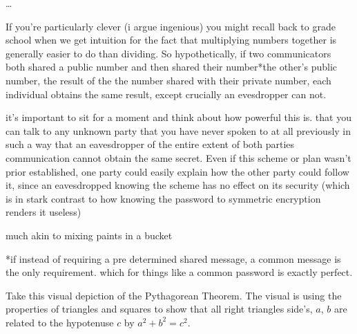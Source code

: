 \documentclass[11pt,a4paper]{article}
\begin{document}
…

If you’re particularly clever (i argue ingenious) you might recall back to grade school when we get intuition for the fact that multiplying numbers together is generally easier to do than dividing. So hypothetically, if two communicators both shared a public number and then shared their number*the other’s public number, the result of the the number shared with their private number, each individual obtains the same result, except crucially an evesdropper can not. 

it’s important to sit for a moment and think about how powerful this is. that you can talk to any unknown party that you have never spoken to at all previously in such a way that an eavesdropper of the entire extent of both parties communication cannot obtain the same secret. Even if this scheme or plan wasn’t prior established, one party could easily explain how the other party could follow it, since an eavesdropped knowing the scheme has no effect on its security (which is in stark contrast to how knowing the password to symmetric encryption renders it useless)

much akin to mixing paints in a bucket


*if instead of requiring a pre determined shared message, a common message is the only requirement. which for things like a common password is exactly perfect. 


\iffalse
\pagebreak
\section{Understanding Proof Through Pythagoras}
\subsection{The First Proof \textit{circa} 200 BCE}
\begin{figure}[h]
\begin{center}
\texttt{[image: proof of pt]} 
\caption{Proof of Pythagorean Theorem circa \textit{200 BC}}
\end{center}
\end{figure}
\fi

Take this visual depiction of the Pythagorean Theorem. The visual is using the properties of triangles and squares to show that all right triangles side's, $a$, $b$ are related to the hypotenuse $c$ by $a^2 +b^2 = c^2$.
\end{document}
